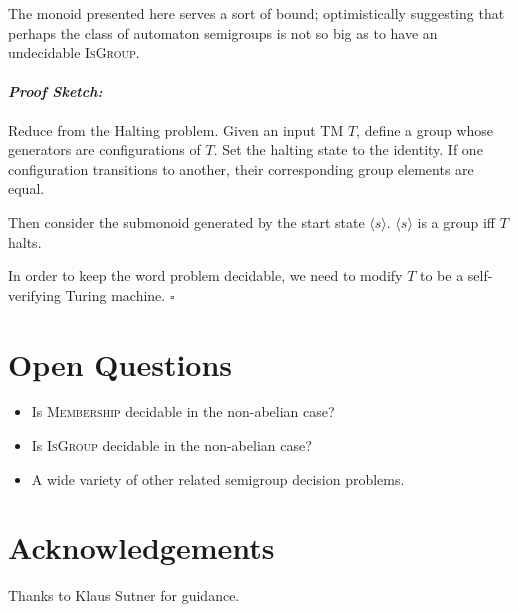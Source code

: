 \documentclass[a0]{a0poster}
\newcommand{\decprob}[1]{\textsc{#1}}
\theoremstyle{pleasant}
\newenvironment{proofsketch}{\paragraph{\Large \normalfont \textit{Proof Sketch:}}}{\hfill$\square$}
\newcommand{\0}{\underline{0}}
\newcommand{\1}{\underline{1}}
\newcommand{\2}{\underline{2}}
\begin{document}
\begin{multicols}{3}
The monoid presented here serves a sort of bound; optimistically
suggesting that perhaps the class of automaton semigroups is not so
big as to have an undecidable \decprob{IsGroup}.

\begin{proofsketch}
  Reduce from the Halting problem. Given an input TM $T$, define a
  group whose generators are configurations of $T$. Set the halting
  state to the identity. If one configuration transitions to another,
  their corresponding group elements are equal.

  Then consider the submonoid generated by the start state
  $\langle s \rangle$. $\langle s \rangle$ is a group iff $T$ halts.

  In order to keep the word problem decidable, we need to modify $T$
  to be a self-verifying Turing machine.
\end{proofsketch}

\section*{Open Questions}

\begin{itemize}
\item Is \textsc{Membership} decidable in the non-abelian case?
\item Is \textsc{IsGroup} decidable in the non-abelian case?
\item A wide variety of other related semigroup decision problems.
\end{itemize}

\section*{Acknowledgements}

Thanks to Klaus Sutner for guidance.

\end{multicols}
\end{document}
